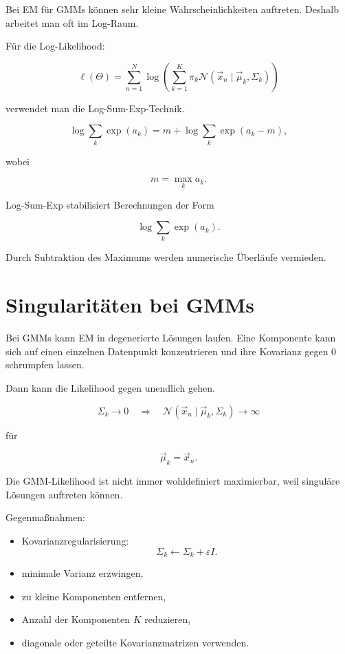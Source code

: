 Bei EM für GMMs können sehr kleine Wahrscheinlichkeiten auftreten.
Deshalb arbeitet man oft im Log-Raum.

Für die Log-Likelihood:

\[
    \ell(\Theta)
    =
    \sum_{n=1}^{N}
    \log
    \left(
        \sum_{k=1}^{K}
        \pi_k
        \mathcal{N}(\vec{x}_n\mid\vec{\mu}_k,\Sigma_k)
    \right)
\]

verwendet man die Log-Sum-Exp-Technik.

\[
    \log\sum_k\exp(a_k)
    =
    m
    +
    \log
    \sum_k
    \exp(a_k-m),
\]

wobei

\[
    m=\max_k a_k.
\]

\begin{definitionbox}
Log-Sum-Exp stabilisiert Berechnungen der Form

\[
    \log\sum_k\exp(a_k).
\]

Durch Subtraktion des Maximums werden numerische Überläufe vermieden.
\end{definitionbox}

\section{Singularitäten bei GMMs}

Bei GMMs kann EM in degenerierte Lösungen laufen.
Eine Komponente kann sich auf einen einzelnen Datenpunkt konzentrieren und ihre Kovarianz gegen \(0\) schrumpfen lassen.

Dann kann die Likelihood gegen unendlich gehen.

\[
    \Sigma_k\to 0
    \quad
    \Rightarrow
    \quad
    \mathcal{N}(\vec{x}_n\mid\vec{\mu}_k,\Sigma_k)\to\infty
\]

für

\[
    \vec{\mu}_k=\vec{x}_n.
\]

\begin{examtipbox}
Die GMM-Likelihood ist nicht immer wohldefiniert maximierbar, weil singuläre Lösungen auftreten können.
\end{examtipbox}

Gegenmaßnahmen:

\begin{itemize}
    \item Kovarianzregularisierung:
    \[
        \Sigma_k
        \leftarrow
        \Sigma_k+\varepsilon I.
    \]

    \item minimale Varianz erzwingen,
    \item zu kleine Komponenten entfernen,
    \item Anzahl der Komponenten \(K\) reduzieren,
    \item diagonale oder geteilte Kovarianzmatrizen verwenden.
\end{itemize}

